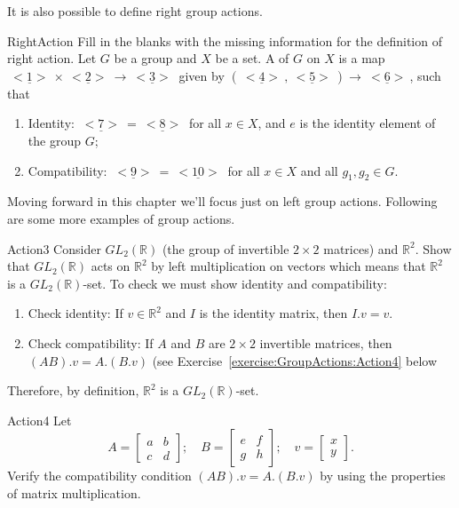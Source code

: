 It is also possible to define right group actions.

\begin{exercise}{RightAction}
Fill in the blanks with the missing information for the definition of right action. Let $G$ be a group and $X$ be a set. A  of $G$ on $X$ is a map $\underline{~<1>~}\times \underline{~<2>~}\rightarrow \underline{~<3>~}$ given by $(\underline{~<4>~}, \underline{~<5>~})\rightarrow \underline{~<6>~}$, such that
\begin{enumerate}[(1)]
\item Identity: $\underline{~<7>~}=\underline{~<8>~}$ for all $x\in X$, and $e$ is the identity element of the group $G$;
\item Compatibility: $\underline{~<9>~}=\underline{~<10>~}$ for all $x\in X$ and all $g_1, g_2 \in G$.
\end{enumerate}
\end{exercise}

Moving forward in this chapter we'll focus just on left group actions.  Following are some more examples of group actions.

\begin{example}{Action3}
Consider $GL_2(\mathbb{R})$ (the group of invertible $2 \times 2$ matrices) and $\mathbb{R}^2$. Show that $GL_2(\mathbb{R})$ acts on $\mathbb{R}^2$ by left multiplication on vectors which means that $\mathbb{R}^2$ is a $GL_2(\mathbb{R})$-set. To check we must show identity and compatibility:
\begin{enumerate}[(1)]
\item Check identity: If $v\in \mathbb{R}^2$ and $I$ is the identity matrix, then $I.v = v$. 
\item Check compatibility: If $A$ and $B$ are $2 \times 2$ invertible matrices, then $(AB).v = A.(B.v)$ (see Exercise~\ref{exercise:GroupActions:Action4} below\end{enumerate}
Therefore, by definition, $\mathbb{R}^2$ is a $GL_2(\mathbb{R})$-set.
\end{example}

\begin{exercise}{Action4}
Let
\begin{equation*}
A=\left[\begin{array}{cc}
a&b\\c&d\end{array}\right]; \quad 
B=\left[\begin{array}{cc} e& f\\ g & h\end{array}\right]; \quad 
v=\left[\begin{array}{c}x\\ y\end{array}\right].
\end{equation*}
Verify the compatibility condition $(AB).v = A.(B.v)$  by using the properties  of matrix  multiplication. 
\end {exercise}

